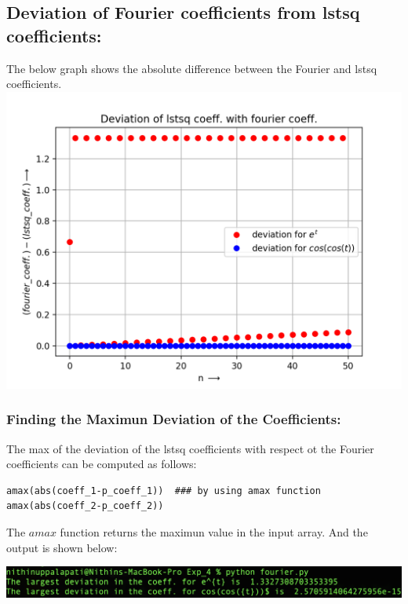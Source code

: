 \documentclass[10pt,english, openany]{book}
\begin{document}
\subsection{Deviation of Fourier coefficients from lstsq coefficients:}
The below graph shows the absolute difference between the Fourier and lstsq coefficients.
{\centering\includegraphics[scale=0.7]{Figure_7.png}}


\subsubsection{Finding the Maximun Deviation of the Coefficients:}
The max of the deviation of the lstsq coefficients with respect ot the Fourier coefficients can be computed as follows:\par

\begin{verbatim}
amax(abs(coeff_1-p_coeff_1))  ### by using amax function
amax(abs(coeff_2-p_coeff_2))
\end{verbatim}

The $amax$ function returns the maximun value in the input array. And the output is shown below:\par
{\centering\includegraphics[scale=0.44]{output.png}}
\end{document}

